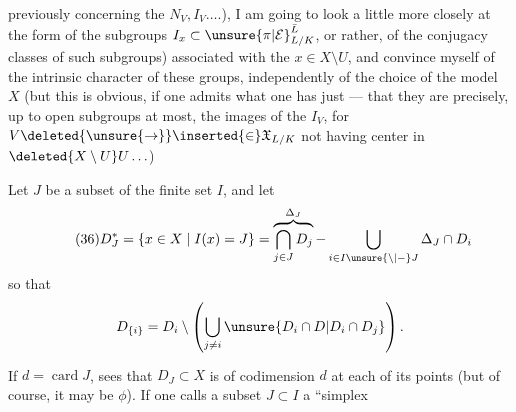 
previously concerning the $N_V,I_V\ldots.$), I am going to look a little more closely at the form of the subgroups $I_x\subset{\unsure{\pi|\mathcal E}}_{L/K}^{\bar L}$, or  rather, of the \inserted{$\pi$-}conjugacy classes of such subgroups) associated with the $x\in X\setminus U$,  and convince myself of the intrinsic character of these groups, independently of the choice of the model $X$ (but this is obvious, if one admits what one has just  --- that they are precisely, up to open subgroups  at most, the images of the $I_V$, for $V\deleted{\unsure{\to}}\inserted{\in}\mathfrak X_{L/K}$ not having  center in $\deleted{X\setminus U}U\ldots$)


Let $J$ be a subset of the finite set $I$, and let
\[
\tag{36}
D_J^*=\{x\in X\mid I(x)=J\}
=\overbrace{\bigcap_{j\in J}D_j}^{\Delta_J}-\bigcup_{i\in I\unsure{\setminus|-}J}\Delta_J\cap D_i
\]
so that
\[
D_{\{i\}}=D_i\setminus\left(\bigcup_{j\ne i}\unsure{D_i\cap D|D_i\cap D_j}\right).
\]
If $d=\operatorname{card}J$,  sees that $D_J\subset X$ is  of codimension\textsuperscript{} $d$ at each of its points (but of course, it may be $\phi$). If one calls a subset $J\subset I$ a ``simplex


